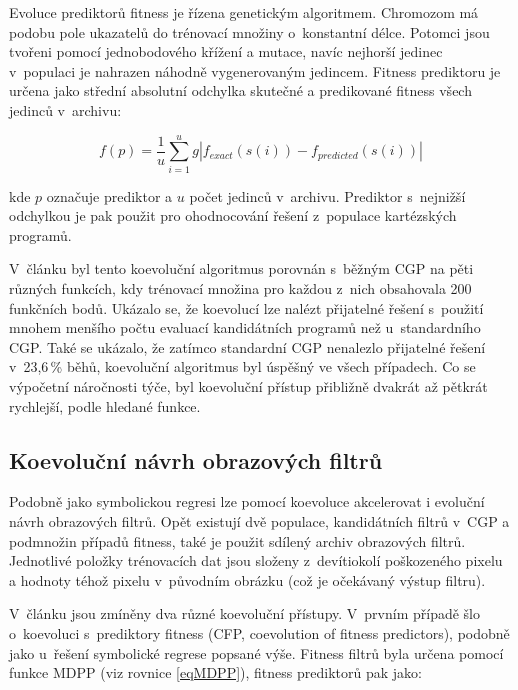 Evoluce prediktorů fitness je řízena genetickým algoritmem. Chromozom má podobu pole ukazatelů do trénovací množiny o~konstantní délce. Potomci jsou tvořeni pomocí jednobodového křížení a mutace, navíc nejhorší jedinec v~populaci je nahrazen náhodně vygenerovaným jedincem. Fitness prediktoru je určena jako střední absolutní odchylka skutečné a predikované fitness všech jedinců v~archivu:

\begin{equation}
    \label{eqFpredictorSR}
    f \left( p \right) = \frac{1}{u} \sum\limits_{i=1}^{u} g \left| f_{\mathit{exact}} \left( s \left( i \right) \right) - f_{\mathit{predicted}} \left( s \left( i \right) \right) \right|
\end{equation}



\noindent{}kde $p$ označuje prediktor a $u$ počet jedinců v~archivu. Prediktor s~nejnižší odchylkou je pak použit pro ohodnocování řešení z~populace kartézských programů.

V~článku \cite{SikuEuroGP} byl tento koevoluční algoritmus porovnán s~běžným CGP na pěti různých funkcích, kdy trénovací množina pro každou z~nich obsahovala 200 funkčních bodů. Ukázalo se, že koevolucí lze nalézt přijatelné řešení s~použití mnohem menšího počtu evaluací kandidátních programů než u~standardního CGP. Také se ukázalo, že zatímco standardní CGP nenalezlo přijatelné řešení v~23,6\,\% běhů, koevoluční algoritmus byl úspěšný ve všech případech. Co se výpočetní náročnosti týče, byl koevoluční přístup přibližně dvakrát až pětkrát rychlejší, podle hledané funkce.


\subsection{Koevoluční návrh obrazových filtrů}

Podobně jako symbolickou regresi lze pomocí koevoluce akcelerovat i evoluční návrh obrazových filtrů. Opět existují dvě populace, kandidátních filtrů v~CGP a podmnožin případů fitness, také je použit sdílený archiv obrazových filtrů. Jednotlivé položky trénovacích dat jsou složeny z~devítiokolí poškozeného pixelu a hodnoty téhož pixelu v~původním obrázku (což je očekávaný výstup filtru).

V~článku \cite{SikuPPSN} jsou zmíněny dva různé koevoluční přístupy. V~prvním případě šlo o~koevoluci s~prediktory fitness (CFP, coevolution of fitness predictors), podobně jako u~řešení symbolické regrese popsané výše. Fitness filtrů byla určena pomocí funkce MDPP (viz rovnice \ref{eqMDPP}), fitness prediktorů pak jako:

